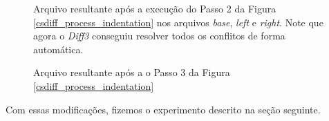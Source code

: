 \begin{figure}[ht]
	\begin{center}
		
		\caption{Arquivo resultante após a execução do Passo 2 da Figura \ref{csdiff_process_indentation} nos arquivos
			\emph{base}, \emph{left} e \emph{right}. Note que agora o \emph{Diff3} conseguiu resolver todos
			os conflitos de forma automática.
		}\label{diff3_marcadores_indentacao}
	\end{center}
\end{figure}

\begin{figure}[ht]
	\begin{center}
        
		\caption{Arquivo resultante após a o Passo 3 da Figura
			\ref{csdiff_process_indentation}}\label{csdiff_indentacao}
	\end{center}
\end{figure}

Com essas modificações, fizemos o experimento descrito na seção seguinte.
